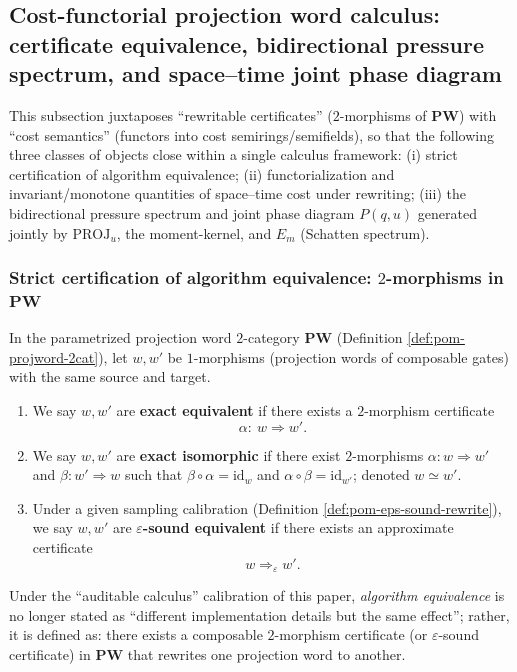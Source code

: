 \subsection{Cost-functorial projection word calculus: certificate equivalence, bidirectional pressure spectrum, and space--time joint phase diagram}\label{subsec:pom-cost-functorial-calculus}
This subsection juxtaposes ``rewritable certificates'' (\(2\)-morphisms of \(\mathbf{PW}\)) with ``cost semantics'' (functors into cost semirings/semifields), so that the following three classes of objects close within a single calculus framework:
(i) strict certification of algorithm equivalence;
(ii) functorialization and invariant/monotone quantities of space--time cost under rewriting;
(iii) the bidirectional pressure spectrum and joint phase diagram \(P(q,u)\) generated jointly by \(\mathrm{PROJ}_u\), the moment-kernel, and \(E_m\) (Schatten spectrum).

\subsubsection{Strict certification of algorithm equivalence: \texorpdfstring{$2$}{2}-morphisms in \texorpdfstring{$\mathbf{PW}$}{PW}}\label{subsec:pom-alg-equivalence-as-2morphism}
\begin{definition}\label{def:pom-alg-equivalence-2morphism}
In the parametrized projection word \(2\)-category \(\mathbf{PW}\) (Definition \ref{def:pom-projword-2cat}), let \(w,w'\) be \(1\)-morphisms (projection words of composable gates) with the same source and target.
\begin{enumerate}
  \item We say \(w,w'\) are \textbf{exact equivalent} if there exists a \(2\)-morphism certificate
  \[
  \alpha:\ w\Rightarrow w'.
  \]
  \item We say \(w,w'\) are \textbf{exact isomorphic} if there exist \(2\)-morphisms \(\alpha:w\Rightarrow w'\) and \(\beta:w'\Rightarrow w\) such that
  \(
  \beta\circ\alpha=\mathrm{id}_w
  \)
  and
  \(
  \alpha\circ\beta=\mathrm{id}_{w'}
  \);
  denoted \(w\simeq w'\).
  \item Under a given sampling calibration (Definition \ref{def:pom-eps-sound-rewrite}), we say \(w,w'\) are \textbf{\(\varepsilon\)-sound equivalent} if there exists an approximate certificate
  \[
  w\Longrightarrow_{\varepsilon} w'.
  \]
\end{enumerate}
Under the ``auditable calculus'' calibration of this paper, \emph{algorithm equivalence} is no longer stated as ``different implementation details but the same effect''; rather, it is defined as: there exists a composable \(2\)-morphism certificate (or \(\varepsilon\)-sound certificate) in \(\mathbf{PW}\) that rewrites one projection word to another.
\end{definition}

